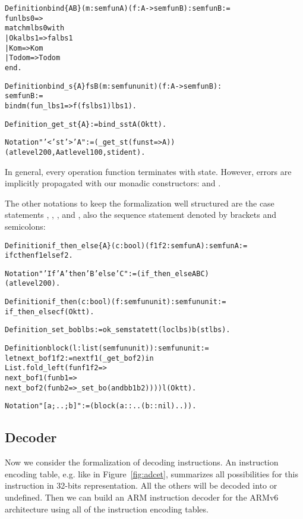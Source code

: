 \begin{alltt}
  Definition bind \{A B\} (m : semfun A) (f : A -> semfun B) : semfun B :=
    fun lbs0 =>
    match m lbs0 with
      | Ok a lbs1 => f a lbs1
      | Ko m => Ko m
      | Todo m => Todo m
    end.

  Definition bind_s \{A\} fs B (m : semfun unit) (f : A -> semfun B) :
    semfun B :=
    bind m (fun _ lbs1 => f (fs lbs1) lbs1).

  Definition _get_st \{A\} := bind_s st A (Ok tt).

  Notation "’<’ st ’>’ A" := (\_get\_st (fun st => A))
    (at level 200, A at level 100, st ident).
\end{alltt}

In general, every operation function terminates with
 state. However, errors are implicitly propagated with
our monadic constructors:  and .

The other notations to keep the formalization well structured are the case
statements , , , and ,
also the sequence statement denoted by brackets and semicolons:

\begin{alltt}
  Definition if_then_else \{A\} (c : bool) (f1 f2 : semfun A) : semfun A :=
    if c then f1 else f2.

  Notation "'If' A 'then' B 'else' C" := (if_then_else A B C)
                                                      (at level 200).

  Definition if_then (c : bool) (f : semfun unit) : semfun unit :=
    if_then_else c f (Ok tt).
\end{alltt}

\begin{alltt}
  Definition _set_bo b lbs := ok_semstate tt (loc lbs) b (st lbs).\

  Definition block (l : list (semfun unit)) : semfun unit :=
    let next_bo f1 f2 := next f1 (_get_bo f2) in
    List.fold_left (fun f1 f2 =>
      next_bo f1 (fun b1 =>
      next_bo f2 (fun b2 => _set_bo (andb b1 b2))) ) l (Ok tt).

  Notation "[ a ; .. ; b ]" := (block (a :: .. (b :: nil) ..)).
\end{alltt}

\subsection{Decoder}
\label{ssc:dec}
Now we consider the formalization of decoding instructions.
An instruction encoding table, e.g. like in Figure~\ref{fig:adcet},
summarizes all possibilities for this instruction in 32-bits representation.
All the others will be decoded into \unpred or undefined.
Then we can build an ARM instruction decoder for the ARMv6 architecture
using all of the instruction encoding tables.

